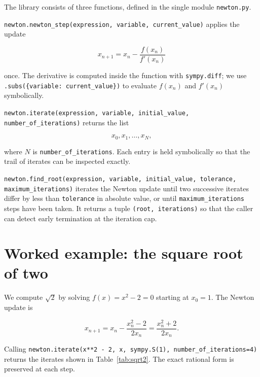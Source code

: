 \documentclass[11pt]{article}
\begin{document}
The library consists of three functions, defined in the single module
\texttt{newton.py}.

\texttt{newton.newton\_step(expression, variable,
current\_value)} applies the update

\[
    x_{n + 1} = x_n - \frac{f(x_n)}{f'(x_n)}
\]

once. The derivative is computed inside the function with
\texttt{sympy.diff}; we use \texttt{.subs(\{variable: current\_value\})} to
evaluate \(f(x_n)\) and \(f'(x_n)\) symbolically.

\texttt{newton.iterate(expression,
variable, initial\_value, number\_of\_iterations)} returns the list

\[
    x_0, x_1, \dots, x_N,
\]

where \(N\) is \texttt{number\_of\_iterations}. Each entry is held
symbolically so that the trail of iterates can be inspected exactly.

\texttt{newton.find\_root(expression,
variable, initial\_value, tolerance, maximum\_iterations)} iterates the
Newton update until two successive iterates differ by less than
\texttt{tolerance} in absolute value, or until \texttt{maximum\_iterations}
steps have been taken. It returns a tuple \texttt{(root, iterations)} so
that the caller can detect early termination at the iteration cap.

\section{Worked example: the square root of two}

We compute \(\sqrt{2}\) by solving \(f(x) = x^2 - 2 = 0\) starting at
\(x_0 = 1\). The Newton update is

\[
    x_{n + 1} = x_n - \frac{x_n^2 - 2}{2 x_n} = \frac{x_n^2 + 2}{2 x_n}.
\]

Calling
\texttt{newton.iterate(x**2 - 2, x, sympy.S(1), number\_of\_iterations=4)}
returns the iterates shown in Table~\ref{tab:sqrt2}. The exact rational
form is preserved at each step.
\end{document}
